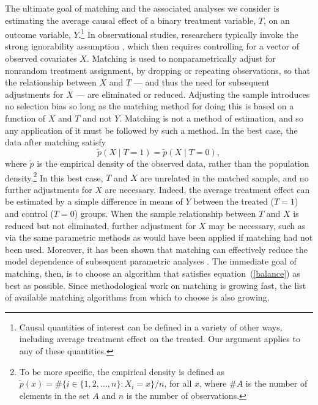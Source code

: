 \documentclass[11pt,titlepage]{article}
\begin{document}
The ultimate goal of matching and the associated analyses we consider
is estimating the average causal effect of a binary treatment
variable, $T$, on an outcome variable, $Y$.\footnote{Causal quantities
  of interest can be defined in a variety of other ways, including
  average treatment effect on the treated.  Our argument applies to
  any of these quantities.}  In observational studies, researchers
typically invoke the strong ignorability assumption \citep{RosRub83},
which then requires controlling for a vector of observed covariates
$X$.  Matching is used to nonparametrically adjust for nonrandom
treatment assignment, by dropping or repeating observations, so that
the relationship between $X$ and $T$ --- and thus the need for
subsequent adjustments for $X$ --- are eliminated or reduced.
Adjusting the sample introduces no selection
bias so long as the matching method
for doing this is based on a function of $X$ and $T$ and not $Y$.
Matching is not a method of estimation, and so any application of it
must be followed by such a method.  In the best case, the data after
matching satisfy
\begin{equation}
  \label{balance}
  \tilde p(X\mid T=1) = \tilde p(X\mid T=0),
\end{equation}
where $\tilde p$ is the empirical density of the observed data, rather
than the population density.\footnote{To be more specific, the
  empirical density is defined as $\tilde p(x) = \# \{ i\in \{1, 2,
  \dots, n \}: X_i = x \} / n$, for all $x$, where $\#A$ is the number
  of elements in the set $A$ and $n$ is the number of observations. }
In this best case, $T$ and $X$ are unrelated in the matched sample,
and no further adjustments for $X$ are necessary. Indeed, the average
treatment effect can be estimated by a simple difference in means of
$Y$ between the treated ($T=1$) and control ($T=0$) groups.  When the
sample relationship between $T$ and $X$ is reduced but not eliminated,
further adjustment for $X$ may be necessary, such as via the same
parametric methods as would have been applied if matching had not been
used. Moreover, it has been shown that matching can effectively reduce
the model dependence of subsequent parametric analyses
\citep{HoImaKin06}.  The immediate goal of matching, then, is to
choose an algorithm that satisfies equation~(\ref{balance}) as best as
possible.  Since methodological work on matching is growing fast, the
list of available matching algorithms from which to choose is also
growing.
\end{document}
